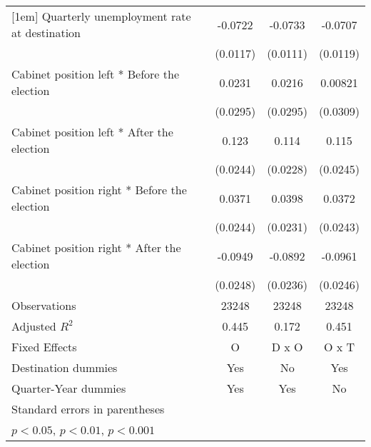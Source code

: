 \begin{table}[htbp]
\begin{tabular}{l*{3}{c}}
[1em]
Quarterly unemployment rate at destination&     -0.0722\sym{***}&     -0.0733\sym{***}&     -0.0707\sym{***}\\
                    &    (0.0117)         &    (0.0111)         &    (0.0119)         \\
[1em]
Cabinet position left * Before the election&      0.0231         &      0.0216         &     0.00821         \\
                    &    (0.0295)         &    (0.0295)         &    (0.0309)         \\
[1em]
Cabinet position left * After the election&       0.123\sym{***}&       0.114\sym{***}&       0.115\sym{***}\\
                    &    (0.0244)         &    (0.0228)         &    (0.0245)         \\
[1em]
Cabinet position right * Before the election&      0.0371         &      0.0398         &      0.0372         \\
                    &    (0.0244)         &    (0.0231)         &    (0.0243)         \\
[1em]
Cabinet position right * After the election&     -0.0949\sym{***}&     -0.0892\sym{***}&     -0.0961\sym{***}\\
                    &    (0.0248)         &    (0.0236)         &    (0.0246)         \\
\hline
Observations        &       23248         &       23248         &       23248         \\
Adjusted \(R^{2}\)  &       0.445         &       0.172         &       0.451         \\
Fixed Effects       &           O         &       D x O         &       O x T         \\
Destination dummies &         Yes         &          No         &         Yes         \\
Quarter-Year dummies&         Yes         &         Yes         &          No         \\
\hline\hline
\multicolumn{4}{l}{\footnotesize Standard errors in parentheses}\\
\multicolumn{4}{l}{\footnotesize \sym{*} \(p<0.05\), \sym{**} \(p<0.01\), \sym{***} \(p<0.001\)}\\
\end{tabular}
\end{table}

